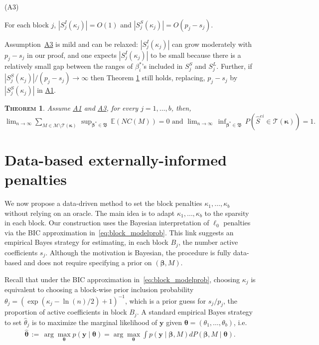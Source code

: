 \documentclass[
  12pt]{article}
\newcommand{\E}{\mathbb{E}}
\newcommand{\M}{\mathcal{M}}
\newcommand{\T}{\mathcal{T}}
\newcommand{\by}{\mathbf{y}}
\newcommand{\bbeta}{\boldsymbol{\beta}}
\newcommand{\btheta}{\boldsymbol{\theta}}
\newcommand{\bkappa}{\boldsymbol{\kappa}}
\newtheorem{thm}{\textsc{Theorem}}[section]
\begin{document}
\hypertarget{lab:A3}{(A3)} \quad For each block $j$, $|S_j^{I}(\kappa_j)|=O(1)$ and $|S_j^{S}(\kappa_j)|=O(p_j-s_j)$.

Assumption~\hyperlink{lab:A3}{A3} is mild and can be relaxed:  
$|S_j^{I}(\kappa_j)|$ can grow moderately with $p_j-s_j$ in our proof,
and one expects $|S_j^{I}(\kappa_j)|$ to be small because there is a relatively small gap between the ranges of $\beta_i^*$'s included in $S_j^S$ and $S_j^L$. 
Further, if $|S_j^{S}(\kappa_j)|/ (p_j-s_j) \to \infty$ then Theorem \ref{thm:convtoT} still holds, replacing, $p_j-s_j$ by $|S_j^{S}(\kappa_j)|$ in \hyperlink{lab:A1}{A1}.
\begin{thm}\label{thm:convtoT}
    Assume \hyperlink{lab:A1}{A1} and \hyperlink{lab:A3}{A3}, for every $j=1,\ldots,b$,  then, \\$\lim_{n \to \infty} \sum_{M \in \M\setminus \T(\bkappa)} \, \sup_{\bbeta^*\in\mathfrak{B}}\, \E\left(NC(M)\right)= 0 \mbox{  and  } 
    \lim_{n \to \infty} \, \inf_{\bbeta^*\in\mathfrak{B}}\, P(\hat{S}^{ei} \in \T(\bkappa))= 1.$
\end{thm}


\section{Data-based externally-informed penalties}\label{sec:informed_l0}

We now propose a data-driven method to set the block penalties $\kappa_1,\ldots,\kappa_b$ without relying on an oracle.
The main idea is to adapt $\kappa_1,\ldots,\kappa_b$ to the sparsity in each block. 
Our construction uses the Bayesian interpretation of $\ell_0$ penalties via the BIC approximation in~\eqref{eq:block_modelprob}.
This link suggests an empirical Bayes strategy for estimating, in each block $B_j$, the number active coefficients $s_j$.
Although the motivation is Bayesian, the procedure is fully data-based and does not require specifying a prior on $(\bbeta,M)$.

Recall that under the BIC approximation in~\eqref{eq:block_modelprob}, choosing $\kappa_j$ is equivalent to choosing a block-wise prior inclusion probability 
$\theta_j=(\exp(\kappa_j-\ln(n)/2)+1)^{-1}$,
which is 
a prior guess for $s_j/p_j$, the proportion of active coefficients in block $B_j$. A standard empirical Bayes strategy to set $\hat{\theta}_j$ is to maximize the marginal likelihood of $\by$ given $\btheta=(\theta_1,\ldots,\theta_b)$, i.e.
\begin{eqnarray}
\hat{\btheta}
\,:=\, \arg\max_{\btheta} p(\by \mid \btheta)=
\arg\max_{\btheta} \int p(\by \mid \bbeta, M) d P(\bbeta, M \mid \btheta).
\nonumber
\end{eqnarray}
\end{document}
